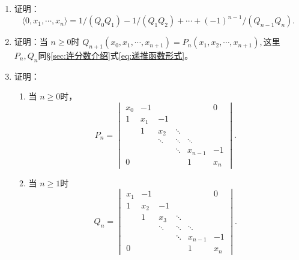 \begin{exercise}
\begin{enumerate}
		\item 证明：
		      \begin{equation*}
			      \langle 0,x_1, \cdots, x_n \rangle = 1/(Q_0Q_1) - 1/(Q_1Q_2) + \cdots + (-1)^{n-1}/(Q_{n-1}Q_n).
		      \end{equation*}
		\item 证明：当 \( n \geqslant 0 \)时 \( Q_{n+1}(x_0, x_1, \cdots, x_{n+1}) = P_n(x_1, x_2, \cdots, x_{n+1}),
		      \)这里 \( P_n, Q_n \)同\S\ref{sec:连分数介绍}式\eqref{eq:递推函数形式}。
		\item 证明：
		      \begin{enumerate}[label=(\roman*)]
			      \item 当 \( n \geqslant 0 \)时，
			            \begin{equation*}
				            P_n =
				            \begin{vmatrix}
					            x_0 & -1  &        &        &         & 0   \\
					            1   & x_1 & -1     &        &         &     \\
					                & 1   & x_2    & \ddots &         &     \\
					                &     & \ddots & \ddots & \ddots  &     \\
					                &     &        & \ddots & x_{n-1} & -1  \\
					            0   &     &        &        & 1       & x_n
				            \end{vmatrix}.
			            \end{equation*}
			      \item 当 \( n \geqslant 1 \)时
			            \begin{equation*}
				            Q_n =
				            \begin{vmatrix}
					            x_1 & -1  &        &        &         & 0   \\
					            1   & x_2 & -1     &        &         &     \\
					                & 1   & x_3    & \ddots &         &     \\
					                &     & \ddots & \ddots & \ddots  &     \\
					                &     &        & \ddots & x_{n-1} & -1  \\
					            0   &     &        &        & 1       & x_n
				            \end{vmatrix}.
			            \end{equation*}

\end{enumerate}
\end{enumerate}
\end{exercise}
